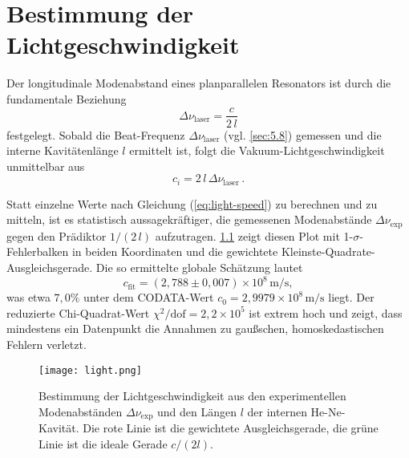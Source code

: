  
 
\chapter{Bestimmung der Lichtgeschwindigkeit}

Der longitudinale Modenabstand eines planparallelen Resonators ist durch die fundamentale Beziehung  
\begin{equation*}
  \Delta\nu_{\mathrm{laser}} = \frac{c}{2\,l}
\end{equation*}
festgelegt. Sobald die Beat-Frequenz \(\Delta\nu_{\mathrm{laser}}\) (vgl. \cref{sec:5.8}) gemessen und die interne Kavitätenlänge \(l\) ermittelt ist, folgt die Vakuum-Lichtgeschwindigkeit unmittelbar aus  
\begin{equation} \label{eq:light-speed}
  c_i = 2\,l\,\Delta\nu_{\mathrm{laser}}\,.
\end{equation}

Statt einzelne Werte nach Gleichung (\cref{eq:light-speed}) zu berechnen und zu mitteln, ist es statistisch aussagekräftiger, die gemessenen Modenabstände \(\Delta\nu_{\mathrm{exp}}\) gegen den Prädiktor \(1/(2\,l)\) aufzutragen. \cref{fig:light-speed} zeigt diesen Plot mit 1-\(\sigma\)-Fehlerbalken in beiden Koordinaten und die gewichtete Kleinste-Quadrate-Ausgleichsgerade. Die so ermittelte globale Schätzung lautet  
\[
  c_{\mathrm{fit}} = (2{,}788 \pm 0{,}007)\times10^{8}\,\mathrm{m/s},
\]  
was etwa \(7{,}0\%\) unter dem CODATA-Wert \(c_0 = 2{,}9979\times10^{8}\,\mathrm{m/s}\) liegt. Der reduzierte Chi-Quadrat-Wert  
\(\chi^2/\mathrm{dof} = 2{,}2\times10^5\)  
ist extrem hoch und zeigt, dass mindestens ein Datenpunkt die Annahmen zu gaußschen, homoskedastischen Fehlern verletzt.
\begin{figure}
  \centering
  \texttt{[image: light.png]}
  \caption{Bestimmung der Lichtgeschwindigkeit aus den experimentellen Modenabständen \(\Delta\nu_{\mathrm{exp}}\) und den Längen \(l\) der internen He-Ne-Kavität. Die rote Linie ist die gewichtete Ausgleichsgerade, die grüne Linie ist die ideale Gerade \(c/(2l)\).}
  \label{fig:light-speed}
\end{figure}

